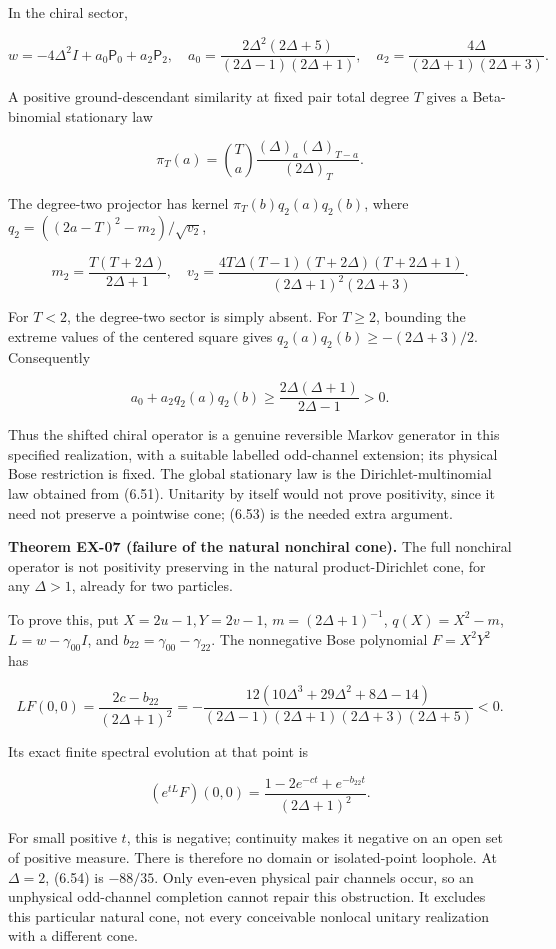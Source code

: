 \documentclass[a4paper,11pt]{article}
\numberwithin{equation}{section}
\begin{document}
In the chiral sector,

\[
w=-4\Delta^2I+a_0\mathsf P_0+a_2\mathsf P_2,
\quad
a_0=\frac{2\Delta^2(2\Delta+5)}{(2\Delta-1)(2\Delta+1)},\quad
a_2=\frac{4\Delta}{(2\Delta+1)(2\Delta+3)}.
\tag{6.50}
\]

A positive ground-descendant similarity at fixed pair total degree \(T\) gives a Beta-binomial stationary law

\[
\pi_T(a)=\binom Ta\frac{(\Delta)_a(\Delta)_{T-a}}{(2\Delta)_T}.
\tag{6.51}
\]

The degree-two projector has kernel \(\pi_T(b)q_2(a)q_2(b)\), where \(q_2=((2a-T)^2-m_2)/\sqrt{v_2}\),

\[
m_2=\frac{T(T+2\Delta)}{2\Delta+1},\quad
v_2=\frac{4T\Delta(T-1)(T+2\Delta)(T+2\Delta+1)}{(2\Delta+1)^2(2\Delta+3)}.
\tag{6.52}
\]

For \(T<2\), the degree-two sector is simply absent. For \(T\ge2\), bounding the extreme values of the centered square gives \(q_2(a)q_2(b)\ge-(2\Delta+3)/2\). Consequently

\[
a_0+a_2q_2(a)q_2(b)\ge\frac{2\Delta(\Delta+1)}{2\Delta-1}>0.
\tag{6.53}
\]

Thus the shifted chiral operator is a genuine reversible Markov generator in this specified realization, with a suitable labelled odd-channel extension; its physical Bose restriction is fixed. The global stationary law is the Dirichlet-multinomial law obtained from (6.51). Unitarity by itself would not prove positivity, since it need not preserve a pointwise cone; (6.53) is the needed extra argument.

\textbf{Theorem EX-07 (failure of the natural nonchiral cone).} The full nonchiral operator is not positivity preserving in the natural product-Dirichlet cone, for any \(\Delta>1\), already for two particles.

To prove this, put \(X=2u-1,Y=2v-1\), \(m=(2\Delta+1)^{-1}\), \(q(X)=X^2-m\), \(L=w-\gamma_{00}I\), and \(b_{22}=\gamma_{00}-\gamma_{22}\). The nonnegative Bose polynomial \(F=X^2Y^2\) has

\[
LF(0,0)=\frac{2c-b_{22}}{(2\Delta+1)^2}
=-\frac{12(10\Delta^3+29\Delta^2+8\Delta-14)}
{(2\Delta-1)(2\Delta+1)(2\Delta+3)(2\Delta+5)}<0.
\tag{6.54}
\]

Its exact finite spectral evolution at that point is

\[
(e^{tL}F)(0,0)=\frac{1-2e^{-ct}+e^{-b_{22}t}}{(2\Delta+1)^2}.
\tag{6.55}
\]

For small positive \(t\), this is negative; continuity makes it negative on an open set of positive measure. There is therefore no domain or isolated-point loophole. At \(\Delta=2\), (6.54) is \(-88/35\). Only even-even physical pair channels occur, so an unphysical odd-channel completion cannot repair this obstruction. It excludes this particular natural cone, not every conceivable nonlocal unitary realization with a different cone.
\end{document}
